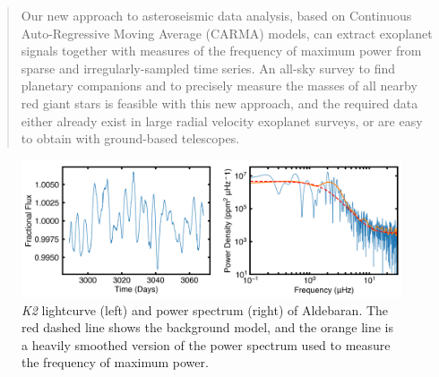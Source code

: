 \documentclass{natureprintstyle}
\newcommand{\apjl}{Astrophys. J. Let.}
\newcommand{\ktwo}{\emph{K2}\xspace}
\begin{document}
\begin{abstract}
Our new approach to asteroseismic data analysis, based on Continuous Auto-Regressive Moving Average (CARMA) models, can extract exoplanet signals together with measures of the frequency of maximum power from sparse and irregularly-sampled time series. An all-sky survey to find planetary companions and to precisely measure the masses of all nearby red giant stars is feasible with this new approach, and the required data either already exist in large radial velocity exoplanet surveys, or are easy to obtain with ground-based telescopes.


\end{abstract}

\begin{figure}[!t]
\begin{center}
\includegraphics[width=\linewidth]{k2obs.png}
\caption{\ktwo lightcurve (left) and power spectrum (right) of Aldebaran. The red dashed line shows the background model, and the orange line is a heavily smoothed version of the power spectrum used to measure the frequency of maximum power. }
\label{fig:k2obs}
\end{center}
\end{figure}





%
 


%
%



\end{document}
